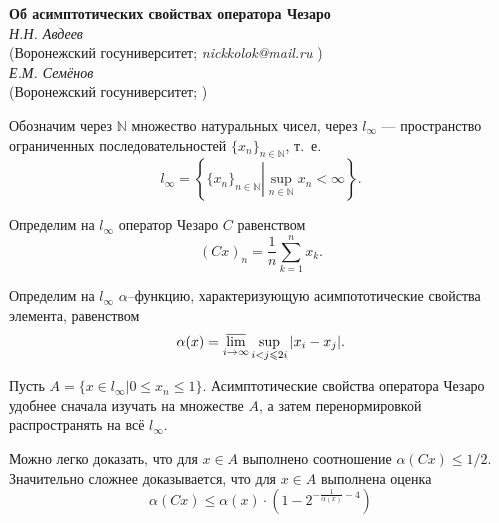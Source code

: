 \documentclass[a5paper,12pt,openbib]{report}
\begin{document}



\begin{center}{ \bf  Об асимптотических свойствах оператора Чезаро }\\
{\it Н.Н. Авдеев } \\
(Воронежский госуниверситет; {\it nickkolok@mail.ru} ) \\
{\it Е.М. Семёнов } \\
(Воронежский госуниверситет; %
)
\end{center}


\setcounter{equation}{1}



Обозначим через $\mathbb{N}$ множество натуральных чисел,
через $l_\infty$ --- пространство ограниченных последовательностей $\{x_n\}_{n\in\mathbb{N}}$,
т.~е.
$$
	l_\infty = \left\{
		\{x_n\}_{n \in \mathbb{N}} \left|
			\sup_{n\in\mathbb{N}} x_n < \infty
		\right.
	\right\}.
$$

Определим на $l_\infty$ оператор Чезаро $C$
равенством
$$
	(Cx)_n = \frac{1}{n}\sum_{k=1}^n x_k.
$$

Определим на $l_\infty$ $\alpha$--функцию,
характеризующую асимпототические свойства элемента,
равенством
$$
	\alpha(x) = \varlimsup_{i\to\infty}\sup_{i < j \leqslant 2i} |x_i - x_j|.
$$

Пусть $A = \{x\in l_\infty | 0 \leqslant x_n \leqslant 1\}$.
Асимптотические свойства оператора Чезаро удобнее сначала изучать на множестве $A$,
а затем перенормировкой распространять на всё $l_\infty$.

Можно легко доказать, что для $x\in A$ выполнено соотношение $\alpha(Cx) \leqslant 1/2$.
Значительно сложнее доказывается, что для $x\in A$ выполнена оценка
$$
	\alpha(Cx) \leqslant \alpha(x) \cdot
	\left(
		1 - 2 ^ {-\frac{1}{\alpha(x)} - 4}
	\right)
$$ 
\end{document}

